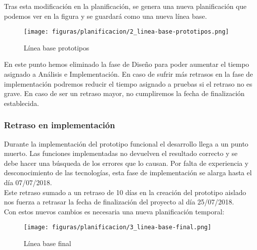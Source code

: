 Tras esta modificación en la planificación, se genera una nueva planificación que podemos ver en la figura y se guardará como una nueva línea base.%

\begin{figure}[H]
    \centerline{\texttt{[image: figuras/planificacion/2\_linea-base-prototipos.png]}}
    \caption{Línea base prototipos}
\end{figure}

En este punto hemos eliminado la fase de Diseño para poder aumentar el tiempo asignado a Análisis e Implementación. En caso de sufrir más retrasos en la fase de implementación podremos reducir el tiempo asignado a pruebas si el retraso no es grave. En caso de ser un retraso mayor, no cumpliremos la fecha de finalización establecida.

\subsubsection{Retraso en implementación}

Durante la implementación del prototipo funcional el desarrollo llega a un punto muerto. Las funciones implementadas no devuelven el resultado correcto y se debe hacer una búsqueda de los errores que lo causan. Por falta de experiencia y desconocimiento de las tecnologías, esta fase de implementación se alarga hasta el día 07/07/2018. \\

Este retraso sumado a un retraso de 10 días en la creación del prototipo aislado nos fuerza a retrasar la fecha de finalización del proyecto al día 25/07/2018. \\

Con estos nuevos cambios es necesaria una nueva planificación temporal:

\begin{figure}[H]
    \centerline{\texttt{[image: figuras/planificacion/3\_linea-base-final.png]}}
    \caption{Línea base final}
\end{figure}

